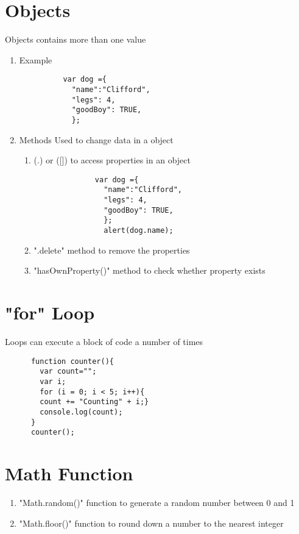 \documentclass{article}
\begin{document}
  \section{Objects}
  Objects contains more than one value
    \begin{enumerate}
      \item Example
        \begin{lstlisting}
          var dog ={
            "name":"Clifford",
            "legs": 4,
            "goodBoy": TRUE,
            };
        \end{lstlisting}
      \item Methods
      Used to change data in a object
        \begin{enumerate}
          \item (.) or ([]) to access properties in an object
            \begin{lstlisting}
              var dog ={
                "name":"Clifford",
                "legs": 4,
                "goodBoy": TRUE,
                };
                alert(dog.name);
            \end{lstlisting}
          \item ".delete" method
          to remove the properties
          \item "hasOwnProperty()" method
          to check whether property exists
        \end{enumerate}
    \end{enumerate}
  \section{"for" Loop}
  Loops can execute a block of code a number of times
    \begin{lstlisting}
      function counter(){
        var count="";
        var i;
        for (i = 0; i < 5; i++){
        count += "Counting" + i;}
        console.log(count);
      }
      counter();
    \end{lstlisting}
  \section{Math Function}
    \begin{enumerate}
      \item "Math.random()" function
      to generate a random number between 0 and 1
      \item "Math.floor()" function
      to round down a number to the nearest integer
    \end{enumerate}
\end{document}
